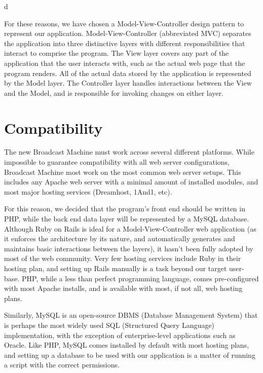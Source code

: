 d\documentclass[a4paper,12pt]{report}
\begin{document}
{{For these reasons, we have chosen a Model-View-Controller design pattern to represent our application. 
Model-View-Controller (abbreviated MVC) separates the application into three distinctive layers with different responsibilities that interact to comprise the program. 
The View layer covers any part of the application that the user interacts with, such as the actual web page that the program renders. 
All of the actual data stored by the application is represented by the Model layer. 
The Controller layer handles interactions between the View and the Model, and is responsible for invoking changes on either layer.

\section{Compatibility}

The new Broadcast Machine must work across several different platforms. 
While impossible to guarantee compatibility with all web server configurations, Broadcast Machine most work on the most common web server setups. 
This includes any Apache web server with a minimal amount of installed modules, and most major hosting services (Dreamhost, 1And1, etc). 

For this reason, we decided that the program’s front end should be written in PHP, while the back end data layer will be represented by a MySQL database. Although Ruby on Rails is ideal for a Model-View-Controller web application (as it enforces the architecture by its nature, and automatically generates and maintains basic interactions between the layers), it hasn’t been fully adopted by most of the web community. 
Very few hosting services include Ruby in their hosting plan, and setting up Rails manually is a task beyond our target user-base. 
PHP, while a less than perfect programming language, comes pre-configured with most Apache installs, and is available with most, if not all, web hosting plans. 

Similarly, MySQL is an open-source DBMS (Database Management System) that is perhaps the most widely used SQL (Structured Query Language) implementation, with the exception of enterprise-level applications such as Oracle. 
Like PHP, MySQL comes installed by default with most hosting plans, and setting up a database to be used with our application is a matter of running a script with the correct permissions. 

}}
\end{document}
